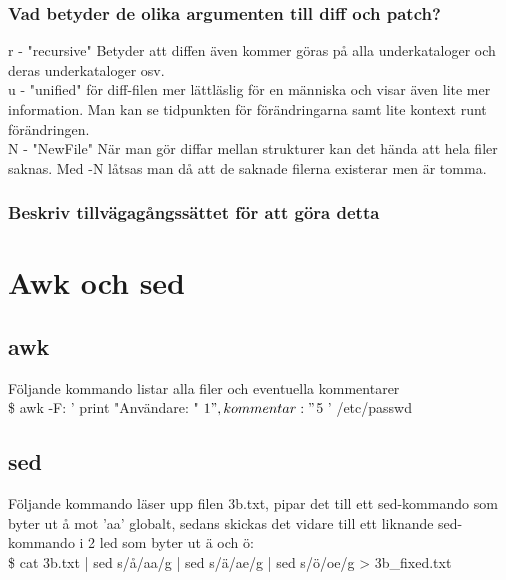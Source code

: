\documentclass[11pt]{article}
\begin{document}
\subsubsection{Vad betyder de olika argumenten till diff och patch?}
r - "recursive" Betyder att diffen även kommer göras på alla underkataloger och deras underkataloger osv.\\
u - "unified" för diff-filen mer lättläslig för en människa och visar även lite mer information. Man kan se tidpunkten för förändringarna samt lite kontext runt förändringen. \\
N - "NewFile" När man gör diffar mellan strukturer kan det hända att hela filer saknas. Med -N låtsas man då att de saknade filerna existerar men är tomma. \\

\subsubsection{Beskriv tillvägagångssättet för att göra detta}



\section{ Awk och sed}
\subsection{awk}Följande kommando listar alla filer och eventuella kommentarer\\
\$ awk -F: '{ print "Användare: " $1 ", kommentar: " $5  }' /etc/passwd

\subsection{sed}
Följande kommando läser upp filen 3b.txt, pipar det till ett sed-kommando som byter ut å mot 'aa' globalt, sedans skickas det vidare till ett liknande sed-kommando i 2 led som byter ut ä och ö:\\
\$ cat 3b.txt | sed s/å/aa/g | sed s/ä/ae/g | sed s/ö/oe/g > 3b\_fixed.txt
\end{document}
